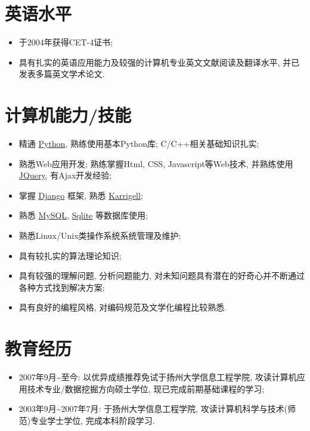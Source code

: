 \documentclass[a4paper,10pt,english]{manual}
\begin{document}
\section{英语水平}
\begin{itemize}
\item {} 
于2004年获得CET-4证书;

\item {} 
具有扎实的英语应用能力及较强的计算机专业英文文献阅读及翻译水平, 并已发表多篇英文学术论文.

\end{itemize}


\section{计算机能力/技能}
\begin{itemize}
\item {} 
精通 \href{http://www.python.org/}{Python}, 熟练使用基本Python库; C/C++相关基础知识扎实;

\item {} 
熟悉Web应用开发; 熟练掌握Html, CSS, Javascript等Web技术, 并熟练使用 \href{http://jquery.com}{JQuery}, 有Ajax开发经验;

\item {} 
掌握 \href{http://www.djangoproject.com/}{Django} 框架, 熟悉 \href{http://karrigell.sourceforge.net/}{Karrigell};

\item {} 
熟悉 \href{http://www.mysql.com}{MySQL}, \href{http://www.sqlite.org}{Sqlite} 等数据库使用;

\item {} 
熟悉Linux/Unix类操作系统系统管理及维护;

\item {} 
具有较扎实的算法理论知识;

\item {} 
具有较强的理解问题, 分析问题能力, 对未知问题具有潜在的好奇心并不断通过各种方式找到解决方案;

\item {} 
具有良好的编程风格, 对编码规范及文学化编程比较熟悉.

\end{itemize}


\section{教育经历}
\begin{itemize}
\item {} 
2007年9月\textasciitilde{}至今: 以优异成绩推荐免试于扬州大学信息工程学院, 攻读计算机应用技术专业/数据挖掘方向硕士学位, 现已完成前期基础课程的学习;

\item {} 
2003年9月\textasciitilde{}2007年7月: 于扬州大学信息工程学院, 攻读计算机科学与技术(师范)专业学士学位, 完成本科阶段学习.

\end{itemize}
\end{document}
